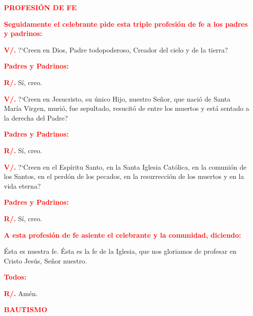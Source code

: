 \documentclass[12pt, letterpaper]{report}
\begin{document}
\Large {\bfseries \textcolor{red}{PROFESI\'ON DE FE}} 

\large {\bfseries \textcolor{red}{Seguidamente el celebrante pide esta triple profesi\'on de fe a los padres y padrinos:}} 

\noindent
\Large {\bfseries \textcolor{red}{V/.}} \hspace{0.5cm} ?`Creen en Dios, Padre todopoderoso, Creador del cielo y de la tierra?

\large {\bfseries \textcolor{red}{Padres y Padrinos:}}

\noindent
\Large {\bfseries \textcolor{red}{R/.}} \hspace{0.5cm} S\'i, creo. 

\newpage

\noindent
\Large {\bfseries \textcolor{red}{V/.}} \hspace{0.5cm} ?`Creen en Jesucristo, su \'unico Hijo, nuestro Se\~nor, que naci\'o de Santa Mar\'ia Virgen, muri\'o, fue sepultado, resucit\'o de entre los muertos y est\'a sentado a la derecha del Padre?

\large {\bfseries \textcolor{red}{Padres y Padrinos:}}

\noindent
\Large {\bfseries \textcolor{red}{R/.}} \hspace{0.5cm} S\'i, creo. 

\noindent
\Large {\bfseries \textcolor{red}{V/.}} \hspace{0.5cm} ?`Creen en el Esp\'iritu Santo, en la Santa Iglesia Cat\'olica, en la comuni\'on de los Santos, en el perd\'on de los pecados, en la resurrecci\'on de los muertos y en la vida eterna?

\large {\bfseries \textcolor{red}{Padres y Padrinos:}}

\noindent
\Large {\bfseries \textcolor{red}{R/.}} \hspace{0.5cm} S\'i, creo. 

\large {\bfseries \textcolor{red}{A esta profesi\'on de fe asiente el celebrante y la comunidad, diciendo:}}

\Large \'Esta es nuestra fe. \'Esta es la fe de la Iglesia, que nos gloriamos de profesar en Cristo Jes\'us, Se\~nor nuestro.

\large {\bfseries \textcolor{red}{Todos:}}

\noindent
\Large {\bfseries \textcolor{red}{R/.}} \hspace{0.5cm} Am\'en. 

\Large {\bfseries \textcolor{red}{BAUTISMO}} 
\end{document}
